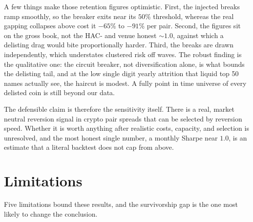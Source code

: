 \documentclass[11pt]{article}
\begin{document}
A few things make those retention figures optimistic. First, the injected breaks ramp
smoothly, so the breaker exits near its $50\%$ threshold, whereas the real gapping collapses above
cost it $-65\%$ to $-91\%$ per pair. Second, the figures sit on the gross book, not the HAC- and
venue honest $\sim 1.0$, against which a delisting drag would bite proportionally harder. Third, the
breaks are drawn independently, which understates clustered risk off waves. The robust finding is the
qualitative one: the circuit breaker, not diversification alone, is what bounds the delisting tail,
and at the low single digit yearly attrition that liquid top 50 names actually see, the haircut is
modest. A
fully point in time universe of every delisted coin is still beyond our data.

The defensible claim is therefore the sensitivity itself. There is a real, market neutral
reversion signal in crypto pair spreads that can be selected by reversion speed. Whether it is
worth anything after realistic costs, capacity, and selection is unresolved, and the most honest
single number, a monthly Sharpe near $1.0$, is an estimate that a literal backtest does not cap
from above.

\section{Limitations}
\label{sec:limits}

Five limitations bound these results, and the survivorship gap is the one most likely to change
the conclusion.
\end{document}
